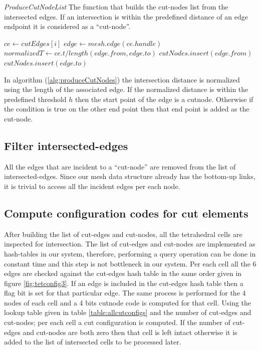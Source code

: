 \begin{algorithm}[H]
\caption{\textit{ProduceCutNodeList} The function that builds the cut-nodes list from the intersected edges.
If an intersection is within the predefined distance of an edge endpoint it is considered as a ``cut-node''.}
\label{alg:produceCutNodes}
\begin{algorithmic}[1]	
  \STATE $ce \gets cutEdges\left[i\right]$
  \STATE $edge \gets mesh.edge(ce.handle)$
  \STATE $normalizedT \gets ce.t / length(edge.from, edge.to)$
  \STATE $cutNodes.insert(edge.from)$
  \ELSE
    \STATE $cutNodes.insert(edge.to)$
    \ENDIF
  \ENDIF
  \ENDFOR
\end{algorithmic}
\end{algorithm}

In algorithm (\ref{alg:produceCutNodes}) the intersection distance is normalized using the length of the associated edge.
If the normalized distance is within the predefined threshold $h$ then the start point of the edge is a cutnode. Otherwise
if the condition is true on the other end point then that end point is added as the cut-node.

\subsection{Filter intersected-edges}
All the edges that are incident to a ``cut-node'' are removed from the list of intersected-edges. Since our mesh data structure 
already has the bottom-up links, it is trivial to access all the incident edges per each node. 


\subsection{Compute configuration codes for cut elements}
\label{sec:cutconfigs}
After building the list of cut-edges and cut-nodes, all the tetrahedral cells are inspected for intersection. 
The list of cut-edges and cut-nodes are implemented as hash-tables in our system, therefore, performing a query operation can be done 
in constant time and this step is not bottleneck in our system. Per each cell all the 6 edges are checked against the cut-edges hash table 
in the same order given in figure \ref{fig:tetconfig3}. If an edge is included in the cut-edges hash table then a flag bit is set for that
particular edge. The same process is performed for the 4 nodes of each cell and a 4 bits cutnode code is computed for that cell.
Using the lookup table given in table \ref{table:allcutconfigs} and the number of cut-edges and cut-nodes; per each cell a cut configuration
is computed.  If the number of cut-edges and cut-nodes are both zero then that cell is left intact otherwise it is added to the list of intersected cells
to be processed later.

